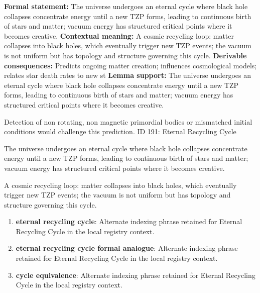 \begingroup\footnotesize\setlength{\emergencystretch}{3em}\sloppy
\textbf{Formal statement:} The universe undergoes an eternal cycle where black hole collapses concentrate energy until a new TZP forms, leading to continuous birth of stars and matter; vacuum energy has structured critical points where it becomes creative.  
\textbf{Contextual meaning:} A cosmic recycling loop: matter collapses into black holes, which eventually trigger new TZP events; the vacuum is not uniform but has topology and structure governing this cycle.  
\textbf{Derivable consequences:} Predicts ongoing matter creation; influences cosmological models; relates star death rates to new st
\textbf{Lemma support:} The universe undergoes an eternal cycle where black hole collapses concentrate energy until a new TZP forms, leading to continuous birth of stars and matter; vacuum energy has structured critical points where it becomes creative.  \par
\endgroup

Detection of non rotating, non magnetic primordial bodies or mismatched initial conditions would challenge this prediction. ID 191: Eternal Recycling Cycle

The universe undergoes an eternal cycle where black hole collapses concentrate energy until a new TZP forms, leading to continuous birth of stars and matter; vacuum energy has structured critical points where it becomes creative.  

A cosmic recycling loop: matter collapses into black holes, which eventually trigger new TZP events; the vacuum is not uniform but has topology and structure governing this cycle.  
\endgroup

\begin{enumerate}[leftmargin=1.6em,itemsep=6pt,topsep=4pt]
\item \textbf{eternal recycling cycle}: Alternate indexing phrase retained for Eternal Recycling Cycle in the local registry context.
\item \textbf{eternal recycling cycle formal analogue}: Alternate indexing phrase retained for Eternal Recycling Cycle in the local registry context.
\item \textbf{cycle equivalence}: Alternate indexing phrase retained for Eternal Recycling Cycle in the local registry context.
\end{enumerate}


